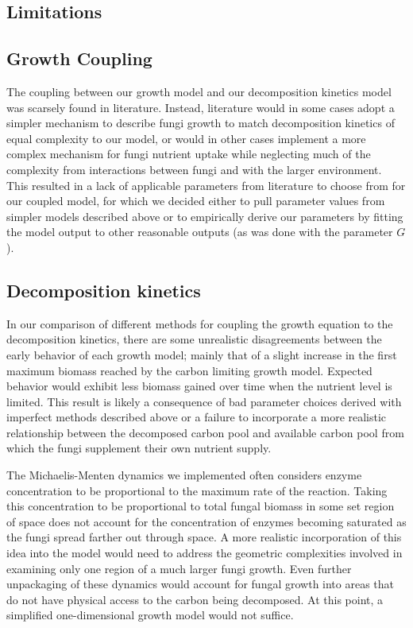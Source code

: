 \documentclass[12pt]{article}
\begin{document}
\begin{multicols}{2}
\section{Limitations}
\subsection{Growth Coupling}
The coupling between our growth model and our decomposition kinetics model was scarsely found in literature. Instead, literature would in some cases adopt a simpler mechanism to describe fungi growth to match decomposition kinetics of equal complexity to our model, or would in other cases implement a more complex mechanism for fungi nutrient uptake while neglecting much of the complexity from interactions between fungi and with the larger environment. This resulted in a lack of applicable parameters from literature to choose from for our coupled model, for which we decided either to pull parameter values from simpler models described above or to empirically derive our parameters by fitting the model output to other reasonable outputs (as was done with the parameter $G$). 

\subsection{Decomposition kinetics}
In our comparison of different methods for coupling the growth equation to the decomposition kinetics, there are some unrealistic disagreements between the early behavior of each growth model; mainly that of a slight increase in the first maximum biomass reached by the carbon limiting growth model. Expected behavior would exhibit less biomass gained over time when the nutrient level is limited. This result is likely a consequence of bad parameter choices derived with imperfect methods described above or a failure to incorporate a more realistic relationship between the decomposed carbon pool and available carbon pool from which the fungi supplement their own nutrient supply.

The Michaelis-Menten dynamics we implemented often considers enzyme concentration to be proportional to the maximum rate of the reaction. Taking this concentration to be proportional to total fungal biomass in some set region of space does not account for the concentration of enzymes becoming saturated as the fungi spread farther out through space. A more realistic incorporation of this idea into the model would need to address the geometric complexities involved in examining only one region of a much larger fungi growth. Even further unpackaging of these dynamics would account for fungal growth into areas that do not have physical access to the carbon being decomposed. At this point, a simplified one-dimensional growth model would not suffice.


\end{multicols}
\end{document}
